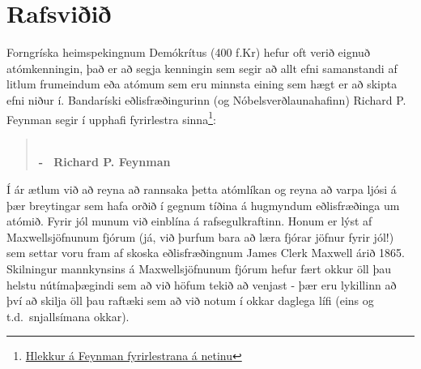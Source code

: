 \ifdefined \wholebook \else\documentclass[oneside]{book}\usepackage{EdlBook}\graphicspath{{figures/}}
\begin{document}
%
\setcounter{chapter}{13} %
%
\fi

\renewcommand{\thefigure}{\arabic{figure}}


\chapter{Rafsviðið}


Forngríska heimspekingnum Demókrítus (400 f.Kr) hefur oft verið eignuð atómkenningin, það er að segja kenningin sem segir að allt efni samanstandi af litlum frumeindum eða atómum sem eru minnsta eining sem hægt er að skipta efni niður í. Bandaríski eðlisfræðingurinn (og Nóbelsverðlaunahafinn) Richard P. Feynman segir í upphafi fyrirlestra sinna\footnote{\href{https://www.feynmanlectures.caltech.edu/}{Hlekkur á Feynman fyrirlestrana á netinu}}:

\blockquote{ \\ \phantom{.} \hfill \textbf{- \, Richard P. Feynman}}

Í ár ætlum við að reyna að rannsaka þetta atómlíkan og reyna að varpa ljósi á þær breytingar sem hafa orðið í gegnum tíðina á hugmyndum eðlisfræðinga um atómið. Fyrir jól munum við einblína á rafsegulkraftinn. Honum er lýst af Maxwellsjöfnunum fjórum (já, við þurfum bara að læra fjórar jöfnur fyrir jól!) sem settar voru fram af skoska eðlisfræðingnum James Clerk Maxwell árið 1865. Skilningur mannkynsins á Maxwellsjöfnunum fjórum hefur fært okkur öll þau helstu nútímaþægindi sem að við höfum tekið að venjast - þær eru lykillinn að því að skilja öll þau raftæki sem að við notum í okkar daglega lífi (eins og t.d.~snjallsímana okkar). \\
\end{document}
